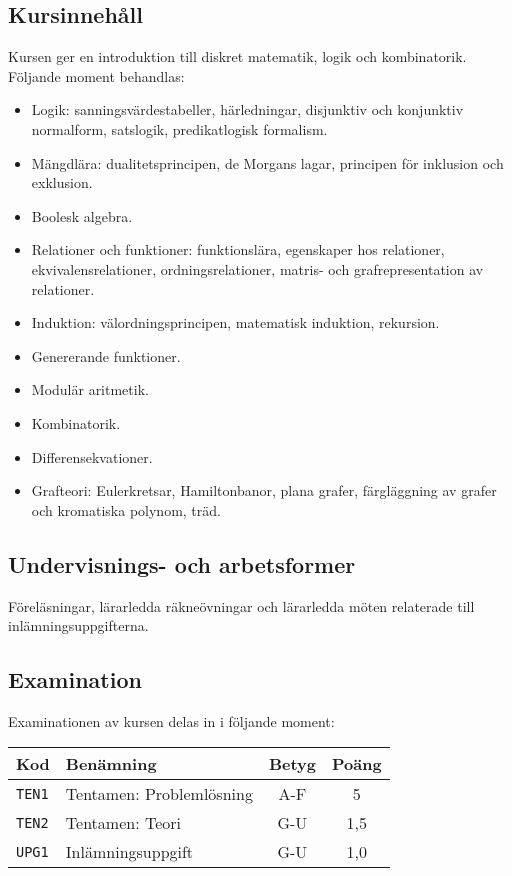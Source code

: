 \subsection*{Kursinnehåll}

Kursen ger en introduktion till diskret matematik, logik och
kombinatorik. Följande moment behandlas:

\begin{itemize}
\tightlist
\item
  Logik: sanningsvärdestabeller, härledningar, disjunktiv och konjunktiv
  normalform, satslogik, predikatlogisk formalism.
\item
  Mängdlära: dualitetsprincipen, de Morgans lagar, principen för
  inklusion och exklusion.
\item
  Boolesk algebra.
\item
  Relationer och funktioner: funktionslära, egenskaper hos relationer,
  ekvivalensrelationer, ordningsrelationer, matris- och
  grafrepresentation av relationer.
\item
  Induktion: välordningsprincipen, matematisk induktion, rekursion.
\item
  Genererande funktioner.
\item
  Modulär aritmetik.
\item
  Kombinatorik.
\item
  Differensekvationer.
\item
  Grafteori: Eulerkretsar, Hamiltonbanor, plana grafer, färgläggning av
  grafer och kromatiska polynom, träd.
\end{itemize}

\subsection*{Undervisnings- och arbetsformer}

Föreläsningar, lärarledda räkneövningar och lärarledda möten relaterade
till inlämningsuppgifterna.

\subsection*{Examination}

Examinationen av kursen delas in i följande moment:

\begin{longtable}[]{@{}llcc@{}}
\toprule
\textsf{Kod} & \textsf{Benämning} & \textsf{Betyg} & \textsf{Poäng}\tabularnewline
\midrule
\endhead
\texttt{TEN1} & Tentamen: Problemlösning & A-F & 5\tabularnewline
\texttt{TEN2} & Tentamen: Teori & G-U & 1,5\tabularnewline
\texttt{UPG1} & Inlämningsuppgift & G-U & 1,0\tabularnewline
\bottomrule
\end{longtable}

